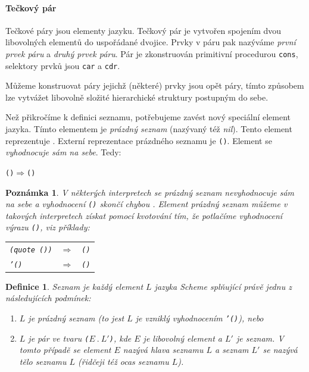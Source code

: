 \documentclass[10pt,a4paper]{article}
\newtheorem{definition}{Definice}
\newtheorem{note}{Poznámka}
\begin{document}
    \paragraph{Tečkový pár} Tečkové páry jsou elementy jazyku. Tečkový pár je vytvořen spojením dvou libovolných elementů do uspořádané dvojice. Prvky v páru pak nazýváme \textit{první prvek páru} a \textit{druhý prvek páru}. Pár je zkonstruován primitivní procedurou \texttt{cons}, selektory prvků jsou \texttt{car} a \texttt{cdr}.

    Můžeme konstruovat páry jejichž (některé) prvky jsou opět páry, tímto způsobem lze vytvážet libovolně složité hierarchické struktury postupným  do sebe.

    Než přikročíme k definici seznamu, potřebujeme zavést nový speciální element jazyka. Tímto elementem je \textit{prázdný seznam} (nazývaný též \textit{nil}). Tento element reprezentuje . Externí reprezentace prázdného seznamu je \texttt{()}. Element  se \textit{vyhodnocuje sám na sebe}. Tedy:

    \texttt{()}\quad$\Rightarrow$\quad\texttt{()}

    \begin{note}
      V některých interpretech se prázdný seznam nevyhodnocuje sám na sebe a vyhodnocení \texttt{()} skončí chybou . Element \textit{prázdný seznam} můžeme v takových interpretech získat pomocí kvotování tím, že potlačíme vyhodnocení výrazu \texttt{()}, viz příklady:
      \begin{tabular}{l c l}
        \texttt{(quote ())} & $\Rightarrow$ & \texttt{()} \\
        \texttt{'()} & $\Rightarrow$ & \texttt{()}
      \end{tabular}
    \end{note}

    \begin{definition}
      \textit{Seznam} je každý element $L$ jazyka Scheme splňující právě jednu z následujících podmínek:
      \begin{enumerate}
        \item $L$ je prázdný seznam (to jest $L$ je vzniklý vyhodnocením \texttt{'()}), nebo
        \item $L$ je pár ve tvaru \texttt{(}$E\ .\ L'$\texttt{)}, kde $E$ je libovolný element a $L'$ je seznam. V tomto případě se element $E$ nazývá \textit{hlava seznamu $L$} a seznam $L'$ se nazývá \textit{tělo seznamu $L$} (řidčeji též \textit{ocas seznamu $L$}).
      \end{enumerate}
    \end{definition}
\end{document}
